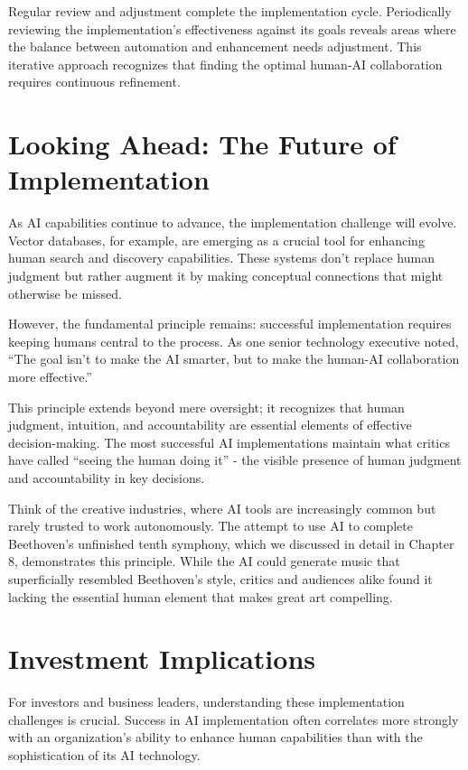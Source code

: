\documentclass[
  Letterpaper,
]{scrbook}
\begin{document}
Regular review and adjustment complete the implementation cycle.
Periodically reviewing the implementation's effectiveness against its
goals reveals areas where the balance between automation and enhancement
needs adjustment. This iterative approach recognizes that finding the
optimal human-AI collaboration requires continuous refinement.

\section{Looking Ahead: The Future of
Implementation}\label{looking-ahead-the-future-of-implementation}

As AI capabilities continue to advance, the implementation challenge
will evolve. Vector databases, for example, are emerging as a crucial
tool for enhancing human search and discovery capabilities. These
systems don't replace human judgment but rather augment it by making
conceptual connections that might otherwise be missed.

However, the fundamental principle remains: successful implementation
requires keeping humans central to the process. As one senior technology
executive noted, ``The goal isn't to make the AI smarter, but to make
the human-AI collaboration more effective.''

This principle extends beyond mere oversight; it recognizes that human
judgment, intuition, and accountability are essential elements of
effective decision-making. The most successful AI implementations
maintain what critics have called ``seeing the human doing it'' - the
visible presence of human judgment and accountability in key decisions.

Think of the creative industries, where AI tools are increasingly common
but rarely trusted to work autonomously. The attempt to use AI to
complete Beethoven's unfinished tenth symphony, which we discussed in
detail in Chapter 8, demonstrates this principle. While the AI could
generate music that superficially resembled Beethoven's style, critics
and audiences alike found it lacking the essential human element that
makes great art compelling.

\section{Investment Implications}\label{investment-implications-3}

For investors and business leaders, understanding these implementation
challenges is crucial. Success in AI implementation often correlates
more strongly with an organization's ability to enhance human
capabilities than with the sophistication of its AI technology.
\end{document}
